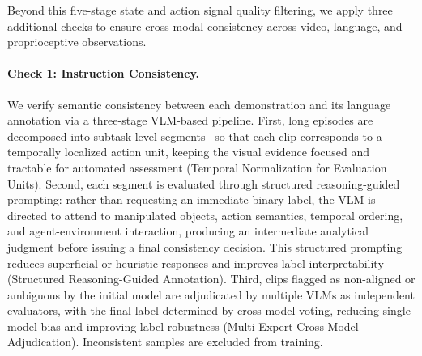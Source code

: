 Beyond this five-stage state and action signal quality filtering, we apply three additional checks to ensure cross-modal consistency across video, language, and proprioceptive observations.


\paragraph{Check 1: Instruction Consistency.} 
We verify semantic consistency between each demonstration and its language annotation via a three-stage VLM-based pipeline. First, long episodes are decomposed into subtask-level segments~\citep{lei2026towards} so that each clip corresponds to a temporally localized action unit, keeping the visual evidence focused and tractable for automated assessment (Temporal Normalization for Evaluation Units). Second, each segment is evaluated through structured reasoning-guided prompting: rather than requesting an immediate binary label, the VLM is directed to attend to manipulated objects, action semantics, temporal ordering, and agent-environment interaction, producing an intermediate analytical judgment before issuing a final consistency decision. This structured prompting reduces superficial or heuristic responses and improves label interpretability (Structured Reasoning-Guided Annotation). Third, clips flagged as non-aligned or ambiguous by the initial model are adjudicated by multiple VLMs as independent evaluators, with the final label determined by cross-model voting, reducing single-model bias and improving label robustness (Multi-Expert Cross-Model Adjudication). Inconsistent samples are excluded from training.


